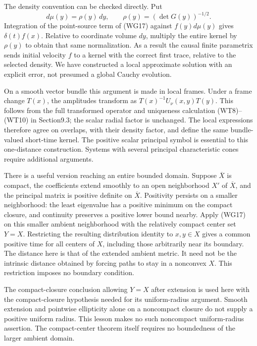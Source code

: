 \documentclass[
  11pt,
]{article}
\begin{document}
The density convention can be checked directly. Put \[
 d\mu(y)=\rho(y)\,dy,\qquad
 \rho(y)=(\det G(y))^{-1/2}.
 \tag{WG18}
\] Integration of the point-source term of (WG17) against
\(f(y)d\mu(y)\) gives \(\delta(t)f(x)\). Relative to coordinate volume
\(dy\), multiply the entire kernel by \(\rho(y)\) to obtain that same
normalization. As a result the causal finite parametrix sends initial
velocity \(f\) to a kernel with the correct first trace, relative to the
selected density. We have constructed a local approximate solution with
an explicit error, not presumed a global Cauchy evolution.

On a smooth vector bundle this argument is made in local frames. Under a
frame change \(T(x)\), the amplitudes transform as
\(T(x)^{-1}U_\nu(x,y)T(y)\). This follows from the full transformed
operator and uniqueness calculation (WT8)--(WT10) in Section9.3; the
scalar radial factor is unchanged. The local expressions therefore agree
on overlaps, with their density factor, and define the same
bundle-valued short-time kernel. The positive scalar principal symbol is
essential to this one-distance construction. Systems with several
principal characteristic cones require additional arguments.

There is a useful version reaching an entire bounded domain. Suppose
\(\overline X\) is compact, the coefficients extend smoothly to an open
neighborhood \(X'\) of \(\overline X\), and the principal matrix is
positive definite on \(\overline X\). Positivity persists on a smaller
neighborhood: the least eigenvalue has a positive minimum on the compact
closure, and continuity preserves a positive lower bound nearby. Apply
(WG17) on this smaller ambient neighborhood with the relatively compact
center set \(Y=X\). Restricting the resulting distribution identity to
\(x,y\in X\) gives a common positive time for all centers of \(X\),
including those arbitrarily near its boundary. The distance here is that
of the extended ambient metric. It need not be the intrinsic distance
obtained by forcing paths to stay in a nonconvex \(X\). This restriction
imposes no boundary condition.

The compact-closure conclusion allowing \(Y=X\) after extension is used
here with the compact-closure hypothesis needed for its uniform-radius
argument. Smooth extension and pointwise ellipticity alone on a
noncompact closure do not supply a positive uniform radius. This lesson
makes no such noncompact uniform-radius assertion. The compact-center
theorem itself requires no boundedness of the larger ambient domain.
\end{document}
